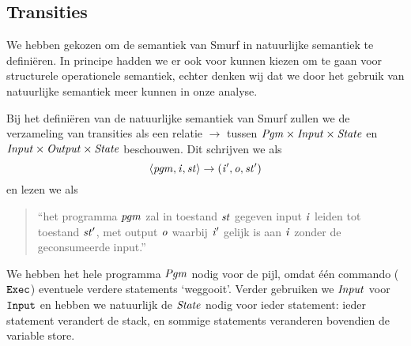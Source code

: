 \subsection{Transities}
\label{sec:def:trans}
We hebben gekozen om de semantiek van Smurf in natuurlijke semantiek te definiëren. In principe hadden we er ook voor kunnen kiezen om te gaan voor structurele operationele semantiek, echter denken wij dat we door het gebruik van natuurlijke semantiek meer kunnen in onze analyse. 

Bij het definiëren van de natuurlijke semantiek van Smurf zullen we de
verzameling van transities als een relatie $\to$ tussen
$\mathit{Pgm}\times\mathit{Input}\times\mathit{State}$ en $\mathit{Input}\times\mathit{Output}\times\mathit{State}$ beschouwen.
Dit schrijven we als
$$\left\langle\mathit{pgm},\mathit{i},\mathit{st}\right\rangle\to\left(\mathit{i}',\mathit{o},\mathit{st}'\right)$$
en lezen we als
\begin{quote}
	``het programma $\mathit{pgm}$ zal in toestand $\mathit{st}$ gegeven input $\mathit{i}$ leiden tot
	toestand $\mathit{st}'$, met output $\mathit{o}$ waarbij $\mathit{i}'$ gelijk is aan $\mathit{i}$ zonder
	de geconsumeerde input.''
\end{quote}

We hebben het hele programma $\mathit{Pgm}$ nodig voor de pijl, omdat één commando
($\texttt{Exec}$) eventuele verdere statements `weggooit'. %
Verder gebruiken we $\mathit{Input}$ voor $\texttt{Input}$ en hebben we natuurlijk de
$\mathit{State}$ nodig voor ieder statement: ieder statement verandert de stack, en
sommige statements veranderen bovendien de variable store.

